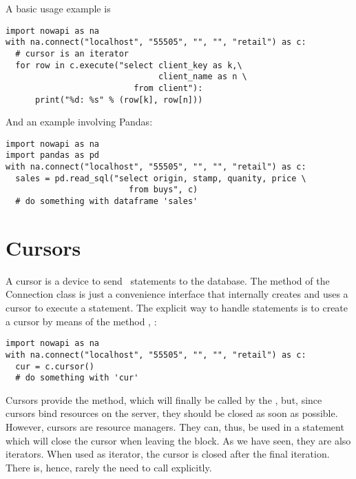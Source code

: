 A basic usage example is

\begin{python}
\begin{lstlisting}
import nowapi as na
with na.connect("localhost", "55505", "", "", "retail") as c:
  # cursor is an iterator
  for row in c.execute("select client_key as k,\
                               client_name as n \
                          from client"):
      print("%d: %s" % (row[k], row[n]))
\end{lstlisting}
\end{python}

And an example involving Pandas:

\begin{python}
\begin{lstlisting}
import nowapi as na
import pandas as pd
with na.connect("localhost", "55505", "", "", "retail") as c:
  sales = pd.read_sql("select origin, stamp, quanity, price \
                         from buys", c)
  # do something with dataframe 'sales'
\end{lstlisting}
\end{python}

\section{Cursors}
A cursor is a device to send \sql\ statements to the database.
The  method of the Connection class is just a
convenience interface that internally creates and uses a
cursor to execute a statement. The explicit way to handle statements
is to create a cursor by means of the method \term{cursor}, \eg:

\begin{python}
\begin{lstlisting}
import nowapi as na
with na.connect("localhost", "55505", "", "", "retail") as c:
  cur = c.cursor()
  # do something with 'cur'
\end{lstlisting}
\end{python}

Cursors provide the  method, which
will finally be called by the ,
but, since cursors bind resources on the server,
they should be closed
as soon as possible.
However, cursors are resource managers.
They can, thus, be used in a  statement
which will close the cursor when leaving the block.
As we have seen, they are also iterators.
When used as iterator, the cursor is closed
after the final iteration.
There is, hence, rarely the need to call 
explicitly.

